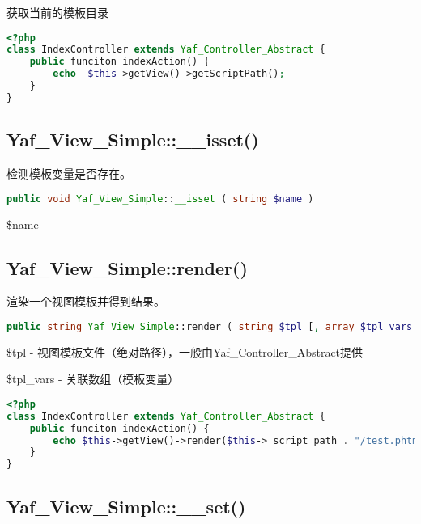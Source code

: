 获取当前的模板目录

\begin{lstlisting}[language=PHP]
<?php
class IndexController extends Yaf_Controller_Abstract {
    public funciton indexAction() {
        echo  $this->getView()->getScriptPath();
    }
}
\end{lstlisting}







\subsection{Yaf\_View\_Simple::\_\_isset()}

检测模板变量是否存在。

\begin{lstlisting}[language=PHP]
public void Yaf_View_Simple::__isset ( string $name )
\end{lstlisting}

\begin{compactitem}
\item \$name
\end{compactitem}

\subsection{Yaf\_View\_Simple::render()}

渲染一个视图模板并得到结果。

\begin{lstlisting}[language=PHP]
public string Yaf_View_Simple::render ( string $tpl [, array $tpl_vars ] )
\end{lstlisting}

\begin{compactitem}
\item \$tpl - 视图模板文件（绝对路径），一般由Yaf\_Controller\_Abstract提供
\item \$tpl\_vars - 关联数组（模板变量）
\end{compactitem}

\begin{lstlisting}[language=PHP]
<?php
class IndexController extends Yaf_Controller_Abstract {
    public funciton indexAction() {
        echo $this->getView()->render($this->_script_path . "/test.phtml");
    }
}
\end{lstlisting}

\subsection{Yaf\_View\_Simple::\_\_set()}

